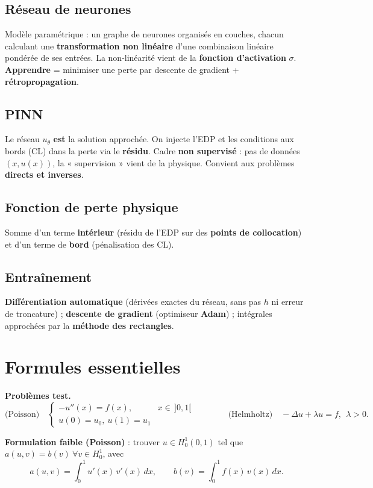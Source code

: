 \documentclass[11pt]{article}
\newcommand{\key}[1]{\textbf{#1}}
\begin{document}
\subsection*{Réseau de neurones}
Modèle paramétrique : un graphe de neurones organisés en couches, chacun calculant
une \key{transformation non linéaire} d'une combinaison linéaire pondérée de ses
entrées. La non-linéarité vient de la \key{fonction d'activation} $\sigma$.
\key{Apprendre} = minimiser une perte par descente de gradient + \key{rétropropagation}.

\subsection*{PINN}
Le réseau $u_\theta$ \key{est} la solution approchée. On injecte l'EDP et les
conditions aux bords (CL) dans la perte via le \key{résidu}. Cadre
\key{non supervisé} : pas de données $(x,u(x))$, la « supervision » vient de la
physique. Convient aux problèmes \key{directs et inverses}.

\subsection*{Fonction de perte physique}
Somme d'un terme \key{intérieur} (résidu de l'EDP sur des \key{points de
collocation}) et d'un terme de \key{bord} (pénalisation des CL).

\subsection*{Entraînement}
\key{Différentiation automatique} (dérivées exactes du réseau, sans pas $h$ ni
erreur de troncature) ; \key{descente de gradient} (optimiseur \key{Adam}) ;
intégrales approchées par la \key{méthode des rectangles}.

\section{Formules essentielles}

\textbf{Problèmes test.}
\[
  \text{(Poisson)}\quad
  \begin{cases}-u''(x)=f(x), & x\in\,]0,1[\\ u(0)=u_0,\ u(1)=u_1\end{cases}
  \qquad\qquad
  \text{(Helmholtz)}\quad -\Delta u+\lambda u=f,\ \ \lambda>0.
\]

\textbf{Formulation faible (Poisson)} : trouver $u\in H^1_0(0,1)$ tel que
$a(u,v)=b(v)\ \forall v\in H^1_0$, avec
\[
  a(u,v)=\int_0^1 u'(x)\,v'(x)\,dx,\qquad b(v)=\int_0^1 f(x)\,v(x)\,dx .
\]
\end{document}
